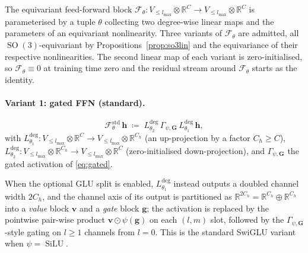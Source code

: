 \documentclass[11pt,a4paper]{article}
\DeclareMathOperator{\SO}{SO}
\DeclareMathOperator{\SiLU}{SiLU}
\newcommand{\R}{\mathbb{R}}
\newcommand{\bG}{\bm{G}}
\newcommand{\bh}{\bm{h}}
\newcommand{\lmax}{l_{\max}}
\theoremstyle{plain}
\theoremstyle{definition}
\theoremstyle{remark}
\begin{document}
The equivariant feed-forward block
$\mathcal{F}_\theta:V_{\le\lmax}\otimes\R^C\to V_{\le\lmax}\otimes\R^C$ is
parameterised by a tuple $\theta$ collecting two degree-wise linear maps and
the parameters of an equivariant nonlinearity. Three variants of
$\mathcal{F}_\theta$ are admitted, all $\SO(3)$-equivariant by
Propositions~\ref{prop:so3lin} and the equivariance of their respective
nonlinearities. The second linear map of each variant is zero-initialised, so
$\mathcal{F}_\theta\equiv 0$ at training time zero and the residual stream
around $\mathcal{F}_\theta$ starts as the identity.

\paragraph{Variant 1: gated FFN (standard).}
\begin{equation}\label{eq:effn-std}
    \mathcal{F}_\theta^{\mathrm{std}}\,\bh\;\coloneqq\;L^{\mathrm{deg}}_{\theta_2}\,\Gamma_{\psi,\bG}\,L^{\mathrm{deg}}_{\theta_1}\,\bh,
\end{equation}
with $L^{\mathrm{deg}}_{\theta_1}:V_{\le\lmax}\otimes\R^C\to V_{\le\lmax}\otimes\R^{C_h}$ (an up-projection by a factor $C_h\geq C$), $L^{\mathrm{deg}}_{\theta_2}:V_{\le\lmax}\otimes\R^{C_h}\to V_{\le\lmax}\otimes\R^C$ (zero-initialised down-projection), and $\Gamma_{\psi,\bG}$ the gated activation of \eqref{eq:gated}.

When the optional GLU split is enabled, $L^{\mathrm{deg}}_{\theta_1}$ instead
outputs a doubled channel width $2C_h$, and the channel axis of its output is
partitioned as $\R^{2C_h}=\R^{C_h}\oplus\R^{C_h}$ into a \emph{value} block
$\bm{v}$ and a \emph{gate} block $\bm{g}$; the activation is replaced by the
pointwise pair-wise product $\bm{v}\odot\psi(\bm{g})$ on each $(l,m)$ slot,
followed by the $\Gamma_{\psi,\bG}$-style gating on $l\geq 1$ channels from
$l=0$. This is the standard SwiGLU variant when $\psi=\SiLU$.
\end{document}
